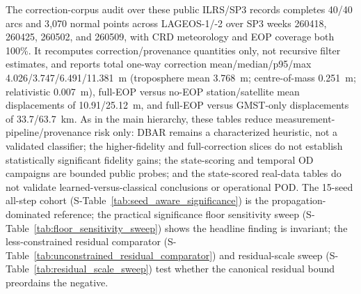 \documentclass{article}
\begin{document}
The correction-corpus audit over these public ILRS/SP3 records completes 40/40 arcs and 3{,}070 normal points across LAGEOS-1/-2 over SP3 weeks 260418, 260425, 260502, and 260509, with CRD meteorology and EOP coverage both 100\%. It recomputes correction/provenance quantities only, not recursive filter estimates, and reports total one-way correction mean/median/p95/max 4.026/3.747/6.491/11.381~m (troposphere mean 3.768~m; centre-of-mass 0.251~m; relativistic 0.007~m), full-EOP versus no-EOP station/satellite mean displacements of 10.91/25.12~m, and full-EOP versus GMST-only displacements of 33.7/63.7~km. As in the main hierarchy, these tables reduce measurement-pipeline/provenance risk only: DBAR remains a characterized heuristic, not a validated classifier; the higher-fidelity and full-correction slices do not establish statistically significant fidelity gains; the state-scoring and temporal OD campaigns are bounded public probes; and the state-scored real-data tables do not validate learned-versus-classical conclusions or operational POD. The 15-seed all-step cohort (S-Table~\ref{tab:seed_aware_significance}) is the propagation-dominated reference; the practical significance floor sensitivity sweep (S-Table~\ref{tab:floor_sensitivity_sweep}) shows the headline finding is invariant; the less-constrained residual comparator (S-Table~\ref{tab:unconstrained_residual_comparator}) and residual-scale sweep (S-Table~\ref{tab:residual_scale_sweep}) test whether the canonical residual bound preordains the negative.













\label{tab:real_slr_lageos_validation}%
\label{tab:real_slr_sp3_od}%
\label{tab:real_slr_sp3_od_expanded}%
\label{tab:real_slr_sp3_od_expanded_stratification}%
\label{tab:real_slr_sp3_od_expanded_mechanism_heterogeneity}%
\label{tab:real_slr_sp3_hifi}%
\label{tab:real_slr_sp3_state_scoring_campaign}%
\label{tab:public_sp3_multi_target_breadth_probe}%
\end{document}
